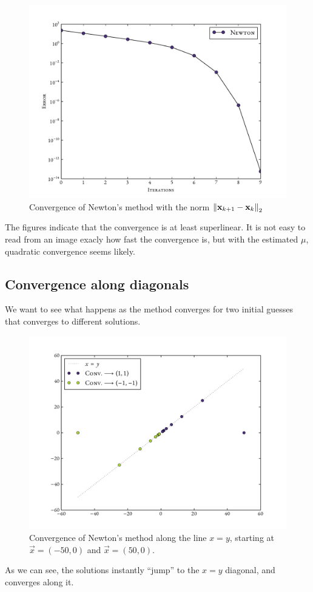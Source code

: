 \documentclass[12pt]{article}
\begin{document}
\begin{multicols}{2}
    \begin{figure}[H]
        \centering
        \includegraphics[width=0.75\columnwidth]{diff_norms}
        \caption{
            Convergence of Newton's method with the norm
            $\Norm[2]{\vec x_{k+1} - \vec x_k }$
        }
        \label{fig:diff_norms}
    \end{figure}\noindent
    The figures indicate that the convergence is at least superlinear.
    It is not easy to read from an image exacly how fast the convergence is,
    but with the estimated $\mu$, quadratic convergence seems likely.

    \subsection*{Convergence along diagonals}
    We want to see what happens as the method converges for
    two initial guesses that converges to different solutions.
    \begin{figure}[H]
        \centering
        \includegraphics[width=0.75\columnwidth]{conv_pn}
        \caption{
            Convergence of Newton's method along the line $x = y$,
            starting at $\vec x = (-50, 0)$ and $\vec x = (50, 0)$.
        }
        \label{fig:conv_pn}
    \end{figure}\noindent
    As we can see, the solutions instantly ``jump'' to the
    $x = y$ diagonal, and converges along it.



\end{multicols}
\end{document}
